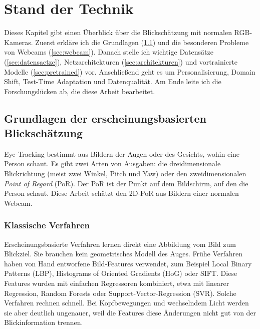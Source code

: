 \chapter{Stand der Technik}
\label{ch:sota}

Dieses Kapitel gibt einen Überblick über die Blickschätzung mit normalen
RGB-Kameras. Zuerst erkläre ich die Grundlagen (\cref{sec:grundlagen}) und die
besonderen Probleme von Webcams (\cref{sec:webcam}). Danach stelle ich wichtige
Datensätze (\cref{sec:datensaetze}), Netzarchitekturen
(\cref{sec:architekturen}) und vortrainierte Modelle (\cref{sec:pretrained})
vor. Anschließend geht es um Personalisierung, Domain Shift, Test-Time
Adaptation und Datenqualität. Am Ende leite ich die Forschungslücken ab, die
diese Arbeit bearbeitet.

\section{Grundlagen der erscheinungsbasierten Blickschätzung}
\label{sec:grundlagen}
Eye-Tracking bestimmt aus Bildern der Augen oder des Gesichts, wohin eine
Person schaut. Es gibt zwei Arten von Ausgaben: die dreidimensionale
Blickrichtung (meist zwei Winkel, Pitch und Yaw) oder den zweidimensionalen
\emph{Point of Regard} (PoR). Der PoR ist der Punkt auf dem Bildschirm, auf den
die Person schaut. Diese Arbeit schätzt den 2D-PoR aus Bildern einer normalen
Webcam.

\subsection{Klassische Verfahren}
\label{subsec:klassisch}
Erscheinungsbasierte Verfahren lernen direkt eine Abbildung vom Bild zum
Blickziel. Sie brauchen kein geometrisches Modell des Auges. Frühe Verfahren
haben von Hand entworfene Bild-Features verwendet, zum Beispiel Local Binary
Patterns (LBP), Histograms of Oriented Gradients (HoG) oder SIFT. Diese
Features wurden mit einfachen Regressoren kombiniert, etwa mit linearer
Regression, Random Forests oder Support-Vector-Regression (SVR). Solche
Verfahren rechnen schnell. Bei Kopfbewegungen und wechselndem Licht werden sie
aber deutlich ungenauer, weil die Features diese Änderungen nicht gut von der
Blickinformation trennen.

